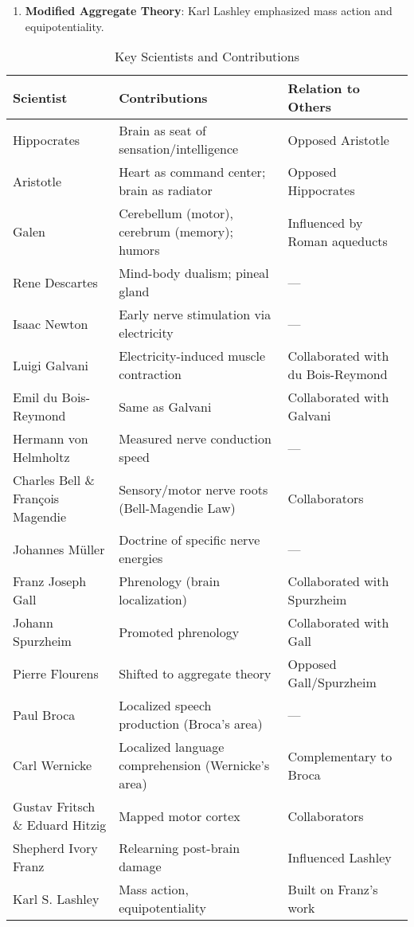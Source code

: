 \begin{enumerate}
    \item \textbf{Modified Aggregate Theory}: Karl Lashley emphasized mass action and equipotentiality.
\end{enumerate}

\begin{landscape}
    \pagestyle{plain}
    \vfill
\begin{table}[h]
\centering
\caption{Key Scientists and Contributions}
\label{tab:neuroscientists}
\begin{tabular}{p{6.5cm}p{9.5cm}p{6.5cm}}
\toprule
\textbf{Scientist} & \textbf{Contributions} & \textbf{Relation to Others} \\
\midrule
Hippocrates & Brain as seat of sensation/intelligence & Opposed Aristotle \\
Aristotle & Heart as command center; brain as radiator & Opposed Hippocrates \\
Galen & Cerebellum (motor), cerebrum (memory); humors & Influenced by Roman aqueducts \\
Rene Descartes & Mind-body dualism; pineal gland & — \\
Isaac Newton & Early nerve stimulation via electricity & — \\
Luigi Galvani & Electricity-induced muscle contraction & Collaborated with du Bois-Reymond \\
Emil du Bois-Reymond & Same as Galvani & Collaborated with Galvani \\
Hermann von Helmholtz & Measured nerve conduction speed & — \\
Charles Bell \& François Magendie & Sensory/motor nerve roots (Bell-Magendie Law) & Collaborators \\
Johannes Müller & Doctrine of specific nerve energies & — \\
Franz Joseph Gall & Phrenology (brain localization) & Collaborated with Spurzheim \\
Johann Spurzheim & Promoted phrenology & Collaborated with Gall \\
Pierre Flourens & Shifted to aggregate theory & Opposed Gall/Spurzheim \\
Paul Broca & Localized speech production (Broca's area) & — \\
Carl Wernicke & Localized language comprehension (Wernicke's area) & Complementary to Broca \\
Gustav Fritsch \& Eduard Hitzig & Mapped motor cortex & Collaborators \\
Shepherd Ivory Franz & Relearning post-brain damage & Influenced Lashley \\
Karl S. Lashley & Mass action, equipotentiality & Built on Franz's work \\
\bottomrule
\end{tabular}
\end{table}
\vfill

\end{landscape}
